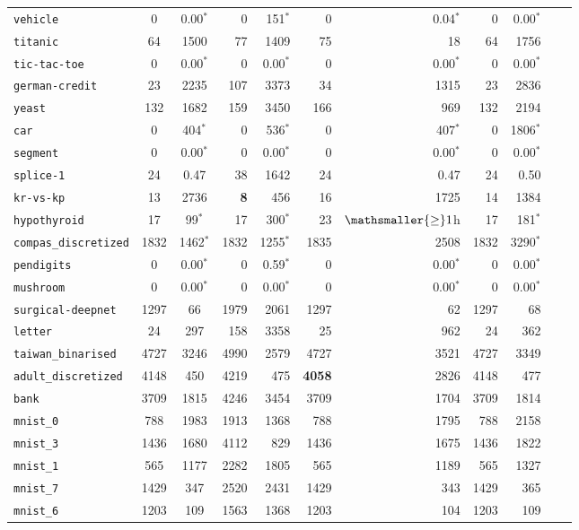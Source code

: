 \begin{tabular}{lccrrrrrrrr}
\texttt{vehicle} & 0 & 0.00$^*$ & 0 & 151$^*$ & 0 & 0.04$^*$ & 0 & 0.00$^*$\\
\texttt{titanic} & 64 & 1500 & 77 & 1409 & 75 & 18 & 64 & 1756\\
\texttt{tic-tac-toe} & 0 & 0.00$^*$ & 0 & 0.00$^*$ & 0 & 0.00$^*$ & 0 & 0.00$^*$\\
\texttt{german-credit} & 23 & 2235 & 107 & 3373 & 34 & 1315 & 23 & 2836\\
\texttt{yeast} & 132 & 1682 & 159 & 3450 & 166 & 969 & 132 & 2194\\
\texttt{car} & 0 & 404$^*$ & 0 & 536$^*$ & 0 & 407$^*$ & 0 & 1806$^*$\\
\texttt{segment} & 0 & 0.00$^*$ & 0 & 0.00$^*$ & 0 & 0.00$^*$ & 0 & 0.00$^*$\\
\texttt{splice-1} & 24 & 0.47 & 38 & 1642 & 24 & 0.47 & 24 & 0.50\\
\texttt{kr-vs-kp} & 13 & 2736 & \textbf{8} & 456 & 16 & 1725 & 14 & 1384\\
\texttt{hypothyroid} & 17 & 99$^*$ & 17 & 300$^*$ & 23 & $\mathsmaller{\geq}1$h & 17 & 181$^*$\\
\texttt{compas\_discretized} & 1832 & 1462$^*$ & 1832 & 1255$^*$ & 1835 & 2508 & 1832 & 3290$^*$\\
\texttt{pendigits} & 0 & 0.00$^*$ & 0 & 0.59$^*$ & 0 & 0.00$^*$ & 0 & 0.00$^*$\\
\texttt{mushroom} & 0 & 0.00$^*$ & 0 & 0.00$^*$ & 0 & 0.00$^*$ & 0 & 0.00$^*$\\
\texttt{surgical-deepnet} & 1297 & 66 & 1979 & 2061 & 1297 & 62 & 1297 & 68\\
\texttt{letter} & 24 & 297 & 158 & 3358 & 25 & 962 & 24 & 362\\
\texttt{taiwan\_binarised} & 4727 & 3246 & 4990 & 2579 & 4727 & 3521 & 4727 & 3349\\
\texttt{adult\_discretized} & 4148 & 450 & 4219 & 475 & \textbf{4058} & 2826 & 4148 & 477\\
\texttt{bank} & 3709 & 1815 & 4246 & 3454 & 3709 & 1704 & 3709 & 1814\\
\texttt{mnist\_0} & 788 & 1983 & 1913 & 1368 & 788 & 1795 & 788 & 2158\\
\texttt{mnist\_3} & 1436 & 1680 & 4112 & 829 & 1436 & 1675 & 1436 & 1822\\
\texttt{mnist\_1} & 565 & 1177 & 2282 & 1805 & 565 & 1189 & 565 & 1327\\
\texttt{mnist\_7} & 1429 & 347 & 2520 & 2431 & 1429 & 343 & 1429 & 365\\
\texttt{mnist\_6} & 1203 & 109 & 1563 & 1368 & 1203 & 104 & 1203 & 109\\

\end{tabular}
